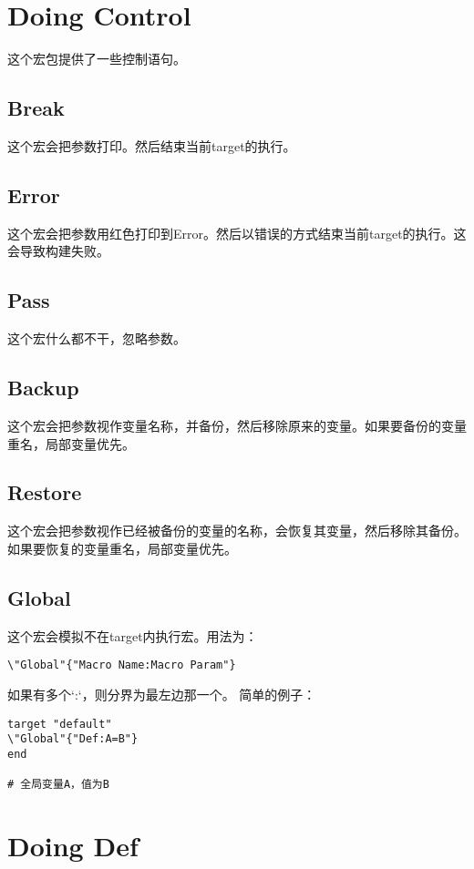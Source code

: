 \section{Doing Control}
这个宏包提供了一些控制语句。

\subsection{Break}
这个宏会把参数打印。然后结束当前target的执行。

\subsection{Error}
这个宏会把参数用红色打印到Error。然后以错误的方式结束当前target的执行。这会导致构建失败。

\subsection{Pass}
这个宏什么都不干，忽略参数。

\subsection{Backup}
这个宏会把参数视作变量名称，并备份，然后移除原来的变量。如果要备份的变量重名，局部变量优先。

\subsection{Restore}
这个宏会把参数视作已经被备份的变量的名称，会恢复其变量，然后移除其备份。如果要恢复的变量重名，局部变量优先。

\subsection{Global}
这个宏会模拟不在target内执行宏。用法为：
\begin{lstlisting}
\"Global"{"Macro Name:Macro Param"}
\end{lstlisting}
如果有多个`:`，则分界为最左边那一个。
简单的例子：
\begin{lstlisting}
target "default"
\"Global"{"Def:A=B"}
end

# 全局变量A，值为B
\end{lstlisting}

\section{Doing Def}


